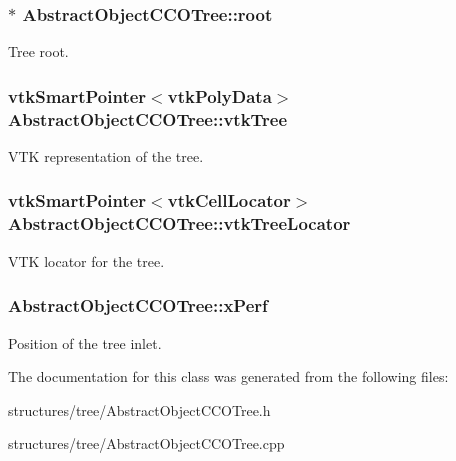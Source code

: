 \subsubsection[{\texorpdfstring{root}{root}}]{$\ast$ Abstract\+Object\+C\+C\+O\+Tree\+::root\hspace{0.3cm}{\ttfamily [protected]}}\hypertarget{class_abstract_object_c_c_o_tree_ae1b17938ad34d92629915159c49bb89a}{}\label{class_abstract_object_c_c_o_tree_ae1b17938ad34d92629915159c49bb89a}
Tree root. 
\subsubsection[{\texorpdfstring{vtk\+Tree}{vtkTree}}]{\setlength{\rightskip}{0pt plus 5cm}vtk\+Smart\+Pointer$<$vtk\+Poly\+Data$>$ Abstract\+Object\+C\+C\+O\+Tree\+::vtk\+Tree\hspace{0.3cm}{\ttfamily [protected]}}\hypertarget{class_abstract_object_c_c_o_tree_a241465d780d31882e94993abc0acb3af}{}\label{class_abstract_object_c_c_o_tree_a241465d780d31882e94993abc0acb3af}
V\+TK representation of the tree. 
\subsubsection[{\texorpdfstring{vtk\+Tree\+Locator}{vtkTreeLocator}}]{\setlength{\rightskip}{0pt plus 5cm}vtk\+Smart\+Pointer$<$vtk\+Cell\+Locator$>$ Abstract\+Object\+C\+C\+O\+Tree\+::vtk\+Tree\+Locator\hspace{0.3cm}{\ttfamily [protected]}}\hypertarget{class_abstract_object_c_c_o_tree_ad46c9e54e0a3093cbd5968ee7f2fa71a}{}\label{class_abstract_object_c_c_o_tree_ad46c9e54e0a3093cbd5968ee7f2fa71a}
V\+TK locator for the tree. 
\subsubsection[{\texorpdfstring{x\+Perf}{xPerf}}]{ Abstract\+Object\+C\+C\+O\+Tree\+::x\+Perf\hspace{0.3cm}{\ttfamily [protected]}}\hypertarget{class_abstract_object_c_c_o_tree_a6b9a8b8d2ba28beba61fe94f9028767c}{}\label{class_abstract_object_c_c_o_tree_a6b9a8b8d2ba28beba61fe94f9028767c}
Position of the tree inlet. 

The documentation for this class was generated from the following files\+:\begin{DoxyCompactItemize}
\item 
structures/tree/Abstract\+Object\+C\+C\+O\+Tree.\+h\item 
structures/tree/Abstract\+Object\+C\+C\+O\+Tree.\+cpp\end{DoxyCompactItemize}
